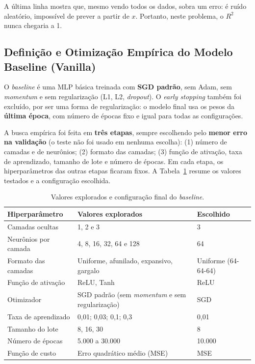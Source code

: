 \documentclass[11pt,a4paper]{article}
\begin{document}
A última linha mostra que, mesmo vendo todos os dados, sobra um erro: é ruído aleatório, impossível de prever a partir de $x$. Portanto, neste problema, o $R^2$ nunca chegaria a 1.

\subsection{Definição e Otimização Empírica do Modelo Baseline (Vanilla)}

O \textit{baseline} é uma MLP básica treinada com \textbf{SGD padrão}, sem Adam, sem \textit{momentum} e sem regularização (L1, L2, \textit{dropout}). O \textit{early stopping} também foi excluído, por ser uma forma de regularização: o modelo final usa os pesos da \textbf{última época}, com número de épocas fixo e igual para todas as configurações.

A busca empírica foi feita em \textbf{três etapas}, sempre escolhendo pelo \textbf{menor erro na validação} (o teste não foi usado em nenhuma escolha): (1) número de camadas e de neurônios; (2) formato das camadas; (3) função de ativação, taxa de aprendizado, tamanho de lote e número de épocas. Em cada etapa, os hiperparâmetros das outras etapas ficaram fixos. A Tabela~\ref{tab:baseline_hiper} resume os valores testados e a configuração escolhida.

\begin{table}[H]
\centering
\small
\caption{Valores explorados e configuração final do \textit{baseline}.}
\label{tab:baseline_hiper}
\begin{tabularx}{\textwidth}{lXl}
\toprule
\textbf{Hiperparâmetro} & \textbf{Valores explorados} & \textbf{Escolhido} \\
\midrule
Camadas ocultas & 1, 2 e 3 & 3 \\
Neurônios por camada & 4, 8, 16, 32, 64 e 128 & 64 \\
Formato das camadas & Uniforme, afunilado, expansivo, gargalo & Uniforme (64-64-64) \\
Função de ativação & ReLU, Tanh & ReLU \\
Otimizador & SGD padrão (sem \textit{momentum} e sem regularização) & SGD \\
Taxa de aprendizado & 0,01; 0,03; 0,1; 0,3 & 0,01 \\
Tamanho do lote & 8, 16, 30 & 8 \\
Número de épocas & 5.000 a 30.000 & 10.000 \\
Função de custo & Erro quadrático médio (MSE) & MSE \\
\bottomrule
\end{tabularx}
\end{table}
\end{document}
